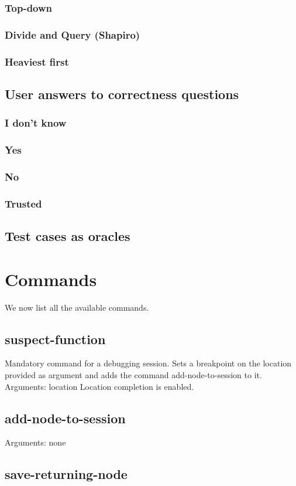 \subsubsection{Top-down}
\subsubsection{Divide and Query (Shapiro)}
\subsubsection{Heaviest first}
\subsection{User answers to correctness questions}
\subsubsection{I don't know}
\subsubsection{Yes}
\subsubsection{No}
\subsubsection{Trusted}
\subsection{Test cases as oracles}
\section{Commands}
We now list all the available commands.
\subsection{suspect-function}
Mandatory command for a debugging session.
Sets a breakpoint on the location provided as argument and adds the command add-node-to-session to it. 
Arguments: location
Location completion is enabled.
\subsection{add-node-to-session}
Arguments: none
\subsection{save-returning-node}
